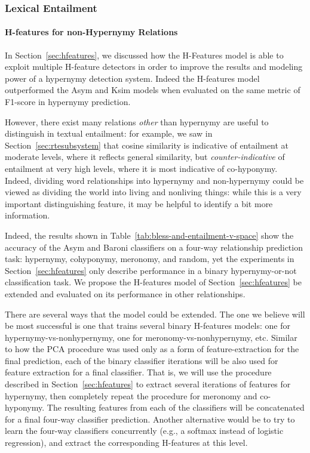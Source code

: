 \documentclass[12pt]{article}
\begin{document}
\subsubsection{Lexical Entailment}

\paragraph{H-features for non-Hypernymy Relations}

In Section~\ref{sec:hfeatures}, we discussed how the H-Features model
is able to exploit multiple H-feature detectors in order to improve the results
and modeling power of a hypernymy detection system. Indeed the H-features
model outperformed the Asym and Ksim models when evaluated on the same metric of
F1-score in hypernymy prediction.

However, there exist many relations {\em other} than hypernymy are useful to
distinguish in textual entailment: for example, we saw in
Section~\ref{sec:rtesubsystem} that cosine similarity is indicative of entailment
at moderate levels, where it reflects general similarity, but {\em counter-indicative}
of entailment at very high levels, where it is most indicative of co-hyponymy.
Indeed, dividing word relationships into hypernymy and non-hypernymy could be
viewed as dividing the world into living and nonliving things: while this is
a very important distinguishing feature, it may be helpful to identify a bit more
information.

Indeed, the results shown in Table~\ref{tab:bless-and-entailment-v-space} show
the accuracy of the Asym and Baroni classifiers on a four-way relationship
prediction task: hypernymy, cohyponymy, meronomy, and random, yet the
experiments in Section~\ref{sec:hfeatures} only describe performance in a
binary hypernymy-or-not classification task. We propose the H-features
model of Section~\ref{sec:hfeatures} be extended and evaluated on its
performance in other relationships.

There are several ways that the model could be extended. The one we believe
will be most successful is one that trains several binary H-features models:
one for hypernymy-vs-nonhypernymy, one for meronomy-vs-nonhypernymy, etc.
Similar to how the PCA procedure was used only as a form of feature-extraction
for the final prediction, each of the binary classifier iterations will be also
used for feature extraction for a final classifier.
That is, we will use the procedure described in Section~\ref{sec:hfeatures}
to extract several iterations of features for hypernymy, then completely repeat
the procedure for meronomy and co-hyponymy. The resulting features from each
of the classifiers will be concatenated for a final four-way classifier prediction.
Another alternative would be to try to learn the four-way classifiers concurrently
(e.g., a softmax instead of logistic regression), and extract the corresponding
H-features at this level.
\end{document}
